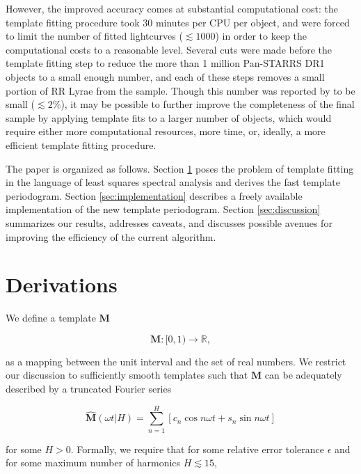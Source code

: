 \documentclass[apj]{emulateapj}
\begin{document}
However, the improved accuracy comes at substantial computational cost: the template fitting 
procedure took 30 minutes per CPU per object, and \cite{Sesar_etal_2016} were forced to limit
the number of fitted lightcurves ($\lesssim 1000$) in order to keep the computational costs
to a reasonable level. Several cuts were made before the template fitting step to reduce the
more than 1 million Pan-STARRS DR1 objects to a small enough number, and each of these steps
removes a small portion of RR Lyrae from the sample. Though this number was reported by
\cite{Sesar_etal_2016} to be small ($\lesssim 2\%$), it may be possible to further improve
the completeness of the final sample by applying template fits to a larger number of objects,
which would require either more computational resources, more time, or, ideally, a more efficient
template fitting procedure.

The paper is organized as follows. Section \ref{sec:derivations} poses the problem of template
fitting in the language of least squares spectral analysis and derives the fast template
periodogram. Section \ref{sec:implementation} describes a freely available implementation 
of the new template periodogram. Section \ref{sec:discussion} summarizes our results, 
addresses caveats, and discusses possible avenues for improving the efficiency of the current 
algorithm.


\section{Derivations}\label{sec:derivations}

We define a template $\mathbf{M}$

\begin{equation}
    \mathbf{M} : [0, 1)\rightarrow\mathbb{R},
\end{equation}

\noindent as a mapping between the unit interval and the set of real numbers. We
restrict our discussion to sufficiently smooth templates such that
$\mathbf{M}$ can be adequately described by a truncated Fourier series

\begin{equation}
    \hat{\mathbf{M}}(\omega t|H) = \sum_{n=1}^H\left[c_n\cos{n\omega t} + s_n\sin{n\omega t}\right]
\end{equation}

\noindent for some $H > 0$. Formally, we require that for some relative error tolerance
$\epsilon$ and for some maximum number of harmonics $H \lesssim 15$, 
\end{document}
